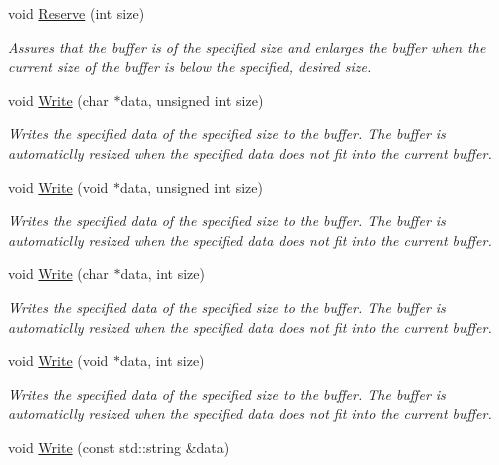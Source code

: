 \begin{DoxyCompactItemize}
void \hyperlink{class_senergy_1_1_byte_buffer_aa650965d24700a696af31aa9cc20fa68}{Reserve} (int size)
\begin{DoxyCompactList}\small\item\em Assures that the buffer is of the specified size and enlarges the buffer when the current size of the buffer is below the specified, desired size. \end{DoxyCompactList}\item 
void \hyperlink{class_senergy_1_1_byte_buffer_a9a561b3dd8778ee68e75e5a62a38fa60}{Write} (char $\ast$data, unsigned int size)
\begin{DoxyCompactList}\small\item\em Writes the specified data of the specified size to the buffer. The buffer is automaticlly resized when the specified data does not fit into the current buffer. \end{DoxyCompactList}\item 
void \hyperlink{class_senergy_1_1_byte_buffer_ac4a328ba46fb339b37cb0475c6944c18}{Write} (void $\ast$data, unsigned int size)
\begin{DoxyCompactList}\small\item\em Writes the specified data of the specified size to the buffer. The buffer is automaticlly resized when the specified data does not fit into the current buffer. \end{DoxyCompactList}\item 
void \hyperlink{class_senergy_1_1_byte_buffer_a3dbfe87ee79c1322252c625bf4915f18}{Write} (char $\ast$data, int size)
\begin{DoxyCompactList}\small\item\em Writes the specified data of the specified size to the buffer. The buffer is automaticlly resized when the specified data does not fit into the current buffer. \end{DoxyCompactList}\item 
void \hyperlink{class_senergy_1_1_byte_buffer_adeb00769eae3728d222587e00810d422}{Write} (void $\ast$data, int size)
\begin{DoxyCompactList}\small\item\em Writes the specified data of the specified size to the buffer. The buffer is automaticlly resized when the specified data does not fit into the current buffer. \end{DoxyCompactList}\item 
void \hyperlink{class_senergy_1_1_byte_buffer_a9dc9ad6de5d9401a698984634537b27a}{Write} (const std\-::string \&data)

\end{DoxyCompactItemize}
